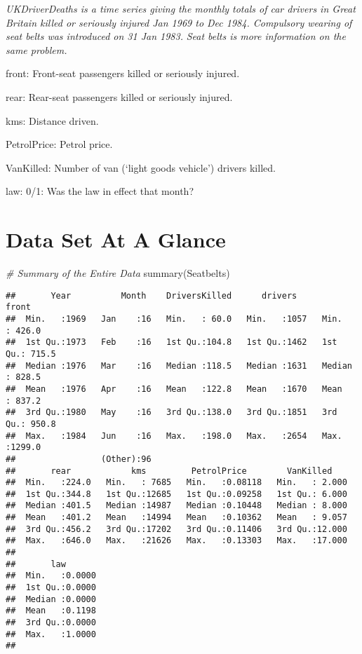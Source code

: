 \documentclass[
]{article}
\newenvironment{Shaded}{\begin{snugshade}}{\end{snugshade}}
\newcommand{\CommentTok}[1]{\textcolor[rgb]{0.56,0.35,0.01}{\textit{#1}}}
\newcommand{\FunctionTok}[1]{\textcolor[rgb]{0.00,0.00,0.00}{#1}}
\newcommand{\NormalTok}[1]{#1}
\begin{document}
\emph{UKDriverDeaths is a time series giving the monthly totals of car
drivers in Great Britain killed or seriously injured Jan 1969 to Dec
1984. Compulsory wearing of seat belts was introduced on 31 Jan 1983.}
\emph{Seat belts is more information on the same problem.}

front: Front-seat passengers killed or seriously injured.

rear: Rear-seat passengers killed or seriously injured.

kms: Distance driven.

PetrolPrice: Petrol price.

VanKilled: Number of van (`light goods vehicle') drivers killed.

law: 0/1: Was the law in effect that month?

\hypertarget{data-set-at-a-glance}{%
\section{Data Set At A Glance}\label{data-set-at-a-glance}}

\begin{Shaded}
\begin{Highlighting}[]
\CommentTok{\# Summary of the Entire Data}
\FunctionTok{summary}\NormalTok{(Seatbelts)}
\end{Highlighting}
\end{Shaded}

\begin{verbatim}
##       Year          Month    DriversKilled      drivers         front       
##  Min.   :1969   Jan    :16   Min.   : 60.0   Min.   :1057   Min.   : 426.0  
##  1st Qu.:1973   Feb    :16   1st Qu.:104.8   1st Qu.:1462   1st Qu.: 715.5  
##  Median :1976   Mar    :16   Median :118.5   Median :1631   Median : 828.5  
##  Mean   :1976   Apr    :16   Mean   :122.8   Mean   :1670   Mean   : 837.2  
##  3rd Qu.:1980   May    :16   3rd Qu.:138.0   3rd Qu.:1851   3rd Qu.: 950.8  
##  Max.   :1984   Jun    :16   Max.   :198.0   Max.   :2654   Max.   :1299.0  
##                 (Other):96                                                  
##       rear            kms         PetrolPrice        VanKilled     
##  Min.   :224.0   Min.   : 7685   Min.   :0.08118   Min.   : 2.000  
##  1st Qu.:344.8   1st Qu.:12685   1st Qu.:0.09258   1st Qu.: 6.000  
##  Median :401.5   Median :14987   Median :0.10448   Median : 8.000  
##  Mean   :401.2   Mean   :14994   Mean   :0.10362   Mean   : 9.057  
##  3rd Qu.:456.2   3rd Qu.:17202   3rd Qu.:0.11406   3rd Qu.:12.000  
##  Max.   :646.0   Max.   :21626   Max.   :0.13303   Max.   :17.000  
##                                                                    
##       law        
##  Min.   :0.0000  
##  1st Qu.:0.0000  
##  Median :0.0000  
##  Mean   :0.1198  
##  3rd Qu.:0.0000  
##  Max.   :1.0000  
## 
\end{verbatim}
\end{document}
